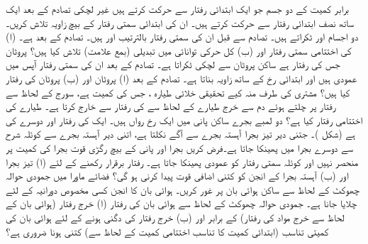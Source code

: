 برابر کمیت کے دو جسم  جو ایک ابتدائی رفتار سے حرکت کرتے ہیں غیر لچکی تصادم کے بعد ایک ساتھ نصف ابتدائی  رفتار سے حرکت کرتے ہیں۔ ان کی ابتدائی سمتی رفتار کے بیچ زاویہ تلاش کریں۔
دو   اجسام  اور   ٹکراتے ہیں۔ تصادم سے قبل ان کی سمتی رفتار بالترتیب   اور  ہیں۔ تصادم کے بعد   ہے۔ (ا)   کی اختتامی سمتی رفتار اور (ب) کل   حرکی توانائی میں تبدیلی (بمع علامت) تلاش کیا ہیں؟
 پروٹان   جس کی رفتار  ہے   ساکن  پروٹان    سے لچکی ٹکراتا ہے۔ تصادم کے بعد ان کی سمتی رفتار  آپس میں عمودی ہیں اور  ابتدائی رخ کے ساتھ  زاویہ بناتا ہے۔ تصادم کے بعد (ا) پروٹان  اور (ب) پروٹان   کی رفتار  کیا ہیں؟
مشتری کی طرف  منہ کیے تحقیقی خلائی طیارہ ، جس کی کمیت  ہے،  سورج کے لحاظ سے   رفتار پر چلتے ہوئے دم سے    خرج   طیارے کے لحاظ سے  کی رفتار سے خارج کرتا ہے۔ طیارے کی اختتامی رفتار کیا  ہے؟
دو لمبے  بجرے  ساکن پانی میں ایک رخ رواں ہیں۔ ایک کی رفتار  اور دوسرے کی  ہے (شکل )۔ جتنی دیر  تیز بجرا آہستہ بجرے سے آگے نکلتا ہے، اتنی دیر  آہستہ بجرے سے کوئلہ  شرح سے دوسرے بجرا میں پھینکا جاتا ہے۔فرض کریں بجرا اور پانی کے بیچ رگڑی قوت بجرا کی کمیت پر منحصر نہیں اور کوئلہ سمتی رفتار کو عمودی پھینکا جاتا ہے۔ رفتار برقرار رکھنے کے لئے (ا) تیز بجرا اور (ب) آہستہ بجرا  کے انجن کو کتنی اضافی قوت پیدا کرنی ہو گی؟ 
فضائے ماورا  میں جمودی  حوالہ چھوکٹ کے لحاظ سے ساکن ہوائی بان   پر غور کریں۔ ہوائی بان کا  انجن کسی مخصوص دورانیہ کے لئے چلایا جانا ہے۔ جمودی  حوالہ چھوکٹ کے لحاظ سے  ہوائی بان کی رفتار (ا)    خرج رفتار (ہوائی بان  کے لحاظ سے خرج مواد کی رفتار) کے برابر  اور (ب) خرج رفتار کی دگنی ہونے کے لئے ہوائی بان کی کمیتی تناسب (ابتدائی کمیت  کا تناسب  اختتامی کمیت  کے لحاظ سے) کتنی ہونا ضروری ہے؟
